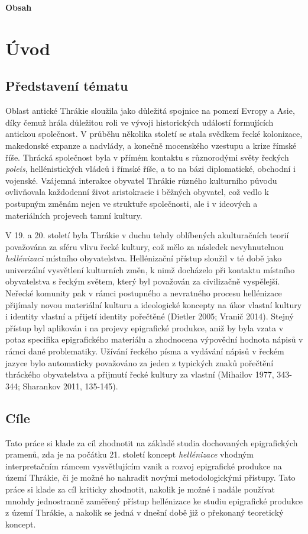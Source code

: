 {\bf Obsah}

\chapter{Úvod}
\section[představení-tématu]{Představení tématu}

Oblast antické Thrákie sloužila jako důležitá spojnice na pomezí Evropy a Asie, díky čemuž hrála důležitou roli ve vývoji historických událostí formujících antickou společnost. V průběhu několika století se stala svědkem řecké kolonizace, makedonské expanze a nadvlády, a konečně mocenského vzestupu a krize římské říše. Thrácká společnost byla v přímém kontaktu s různorodými světy řeckých {\em poleis}, hellénistických vládců i římské říše, a to na bázi diplomatické, obchodní i vojenské. Vzájemná interakce obyvatel Thrákie různého kulturního původu ovlivňovala každodenní život aristokracie i běžných obyvatel, což vedlo k postupným změnám nejen ve struktuře společnosti, ale i v ideových a materiálních projevech tamní kultury.

V 19. a 20. století byla Thrákie v duchu tehdy oblíbených akulturačních teorií považována za sféru vlivu řecké kultury, což mělo za následek nevyhnutelnou {\em hellénizaci} místního obyvatelstva. Hellénizační přístup sloužil v té době jako univerzální vysvětlení kulturních změn, k nimž docházelo při kontaktu místního obyvatelstva s řeckým světem, který byl považován za civilizačně vyspělejší. Neřecké komunity pak v rámci postupného a nevratného procesu hellénizace přijímaly novou materiální kulturu a ideologické koncepty na úkor vlastní kultury i identity vlastní a přijetí identity pořečtěné (Dietler 2005; Vranič 2014). Stejný přístup byl aplikován i na projevy epigrafické produkce, aniž by byla vzata v potaz specifika epigrafického materiálu a zhodnocena výpovědní hodnota nápisů v rámci dané problematiky. Užívání řeckého písma a vydávání nápisů v řeckém jazyce bylo automaticky považováno za jeden z typických znaků pořečtění thráckého obyvatelstva a přijmutí řecké kultury za vlastní (Mihailov 1977, 343-344; Sharankov 2011, 135-145).

\section[cíle]{Cíle}

Tato práce si klade za cíl zhodnotit na základě studia dochovaných epigrafických pramenů, zda je na počátku 21. století koncept {\em hellénizace} vhodným interpretačním rámcem vysvětlujícím vznik a rozvoj epigrafické produkce na území Thrákie, či je možné ho nahradit novými metodologickými přístupy. Tato práce si klade za cíl kriticky zhodnotit, nakolik je možné i nadále používat mnohdy jednostranně zaměřený přístup hellénizace ke studiu epigrafické produkce z území Thrákie, a nakolik se jedná v dnešní době již o překonaný teoretický koncept.

